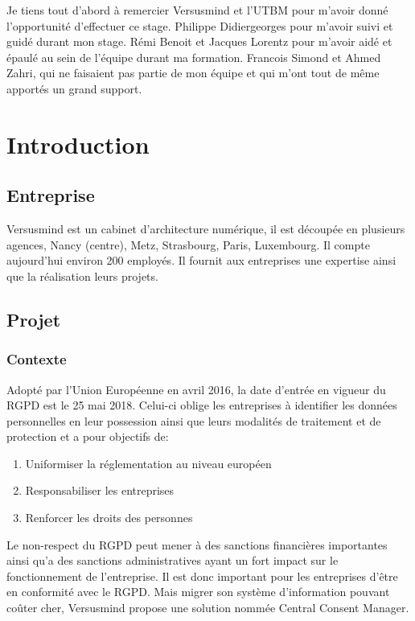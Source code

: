 \documentclass[12pt, a4paper]{report}
\newcommand\tab[1][1cm]{\hspace*{#1}}
\begin{document}
\makeutbmfrontcover{}
    Je tiens tout d'abord à remercier Versusmind et l'UTBM pour m'avoir donné l'opportunité d'effectuer ce stage.\newline\newline
    Philippe Didiergeorges pour m'avoir suivi et guidé durant mon stage.\newline\newline
    Rémi Benoit et Jacques Lorentz pour m'avoir aidé et épaulé au sein de l'équipe durant ma formation.\newline\newline
    Francois Simond et Ahmed Zahri, qui ne faisaient pas partie de mon équipe et qui m'ont tout de même apportés un grand support.
\newpage
\tableofcontents
\chapter{Introduction}
    \section{Entreprise}
        \tab{} Versusmind est un cabinet d'architecture numérique, il est découpée en plusieurs agences, Nancy (centre), Metz, Strasbourg, Paris, Luxembourg.\newline
        Il compte aujourd'hui environ 200 employés. Il fournit aux entreprises une expertise ainsi que la réalisation leurs projets.
    \section{Projet}
        \subsection{Contexte}
            \tab{} Adopté par l’Union Européenne en avril 2016, la date d’entrée en vigueur du RGPD est le 25 mai 2018. Celui-ci oblige les entreprises à identifier les données personnelles en leur possession ainsi que leurs modalités de traitement et de protection et a pour objectifs de\@:
            \begin{enumerate}
                \item Uniformiser la réglementation au niveau européen
                \item Responsabiliser les entreprises
                \item Renforcer les droits des personnes
            \end{enumerate}
            \tab{} Le non-respect du RGPD peut mener à des sanctions financières importantes ainsi qu'a des sanctions administratives ayant un fort impact sur le fonctionnement de l'entreprise.
            Il est donc important pour les entreprises d'être en conformité avec le RGPD.\newline
            Mais migrer son système d'information pouvant coûter cher, Versusmind propose une solution nommée Central Consent Manager.
\end{document}
